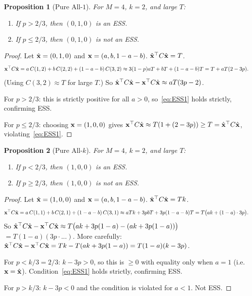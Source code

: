 \documentclass[12pt,a4paper]{article}
\newtheorem{proposition}{Proposition}[section]
\begin{document}
\begin{proposition}[Pure All-$1$]\label{prop:ESS_allone}
For $M=4$, $k=2$, and large $T$:
\begin{enumerate}
  \item If $p>2/3$, then $(0,1,0)$ is an ESS.
  \item If $p\leq 2/3$, then $(0,1,0)$ is not an ESS.
\end{enumerate}
\end{proposition}

\begin{proof}
Let $\hat{\bf x}=(0,1,0)$ and ${\bf x}=(a,b,1-a-b)$.
$\hat{\bf x}^\top C\hat{\bf x}=T$.
\[
  {\bf x}^\top C\hat{\bf x}
  = a\,C(1,2)+b\,C(2,2)+(1-a-b)\,C(3,2)
  \approx 3(1-p)aT+bT+(1-a-b)T = T+aT(2-3p).
\]
(Using $C(3,2)\approx T$ for large $T$.)
So $\hat{\bf x}^\top C\hat{\bf x}-{\bf x}^\top C\hat{\bf x}\approx aT(3p-2)$.

For $p>2/3$: this is strictly positive for all $a>0$, so~\eqref{eq:ESS1} holds
strictly, confirming ESS.

For $p\leq 2/3$: choosing ${\bf x}=(1,0,0)$ gives ${\bf x}^\top C\hat{\bf x}\approx T(1+(2-3p))\geq T=\hat{\bf x}^\top C\hat{\bf x}$, violating~\eqref{eq:ESS1}.
\end{proof}

\begin{proposition}[Pure All-$k$]\label{prop:ESS_allk}
For $M=4$, $k=2$, and large $T$:
\begin{enumerate}
  \item If $p<2/3$, then $(1,0,0)$ is an ESS.
  \item If $p\geq 2/3$, then $(1,0,0)$ is not an ESS.
\end{enumerate}
\end{proposition}

\begin{proof}
Let $\hat{\bf x}=(1,0,0)$ and ${\bf x}=(a,b,1-a-b)$.
$\hat{\bf x}^\top C\hat{\bf x}=Tk$.
\[
  {\bf x}^\top C\hat{\bf x}
  = a\,C(1,1)+b\,C(2,1)+(1-a-b)\,C(3,1)
  \approx aTk+3pbT+3p(1-a-b)T
  = T\bigl(ak+(1-a)\cdot 3p\bigr).
\]
So $\hat{\bf x}^\top C\hat{\bf x}-{\bf x}^\top C\hat{\bf x}\approx T\bigl(ak+3p(1-a)-(ak+3p(1-a))\bigr)$
$=T(1-a)(3p\cdot... )$. More carefully:
$\hat{\bf x}^\top C\hat{\bf x}-{\bf x}^\top C\hat{\bf x}=Tk-T(ak+3p(1-a))=T(1-a)(k-3p)$.

For $p<k/3=2/3$: $k-3p>0$, so this is $\geq 0$ with equality only when $a=1$
(i.e.\ ${\bf x}=\hat{\bf x}$). Condition~\eqref{eq:ESS1} holds strictly, confirming ESS.

For $p>k/3$: $k-3p<0$ and the condition is violated for $a<1$. Not ESS.
\end{proof}
\end{document}
